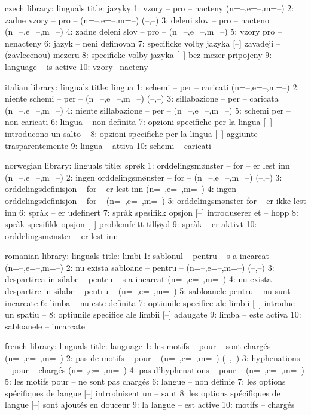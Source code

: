 
\startmessages  czech  library: linguals
  title: jazyky
      1: vzory -- pro -- nacteny (n=--,e=--,m=--)
      2: zadne vzory -- pro -- (n=--,e=--,m=--) (--,--)
      3: deleni slov -- pro -- nacteno (n=--,e=--,m=--)
      4: zadne deleni slov -- pro -- (n=--,e=--,m=--)
      5: vzory pro -- nenacteny
      6: jazyk -- neni definovan
      7: specificke volby jazyka [--] zavadeji -- (zavlecenou) mezeru
      8: specificke volby jazyka [--] bez mezer pripojeny
      9: language -- is active
     10: vzory --nacteny
\stopmessages

\startmessages  italian  library: linguals
  title: lingua
      1: schemi -- per -- caricati (n=--,e=--,m=--)
      2: niente schemi -- per -- (n=--,e=--,m=--) (--,--)
      3: sillabazione -- per -- caricata (n=--,e=--,m=--)
      4: niente sillabazione -- per -- (n=--,e=--,m=--)
      5: schemi per -- non caricati
      6: lingua -- non definita
      7: opzioni specifiche per la lingua [--] introducono un salto --
      8: opzioni specifiche per la lingua [--] aggiunte trasparentemente
      9: lingua -- attiva
     10: schemi -- caricati
\stopmessages

\startmessages  norwegian  library: linguals
  title: sprøk
      1: orddelingsmønster -- for -- er lest inn (n=--,e=--,m=--)
      2: ingen orddelingsmønster -- for -- (n=--,e=--,m=--) (--,--)
      3: orddelingsdefinisjon -- for -- er lest inn (n=--,e=--,m=--)
      4: ingen orddelingsdefinisjon -- for -- (n=--,e=--,m=--)
      5: orddelingsmønster for -- er ikke lest inn
      6: spràk -- er udefinert
      7: spràk spesifikk opsjon [--] introduserer et -- hopp
      8: spràk spesifikk opsjon [--] problemfritt tilføyd
      9: spràk -- er aktivt
     10: orddelingsmønster -- er lest inn
\stopmessages

\startmessages  romanian  library: linguals
  title: limbi
      1: sablonul -- pentru -- s-a incarcat (n=--,e=--,m=--)
      2: nu exista sabloane -- pentru -- (n=--,e=--,m=--) (--,--)
      3: despartirea in silabe -- pentru -- s-a incarcat (n=--,e=--,m=--)
      4: nu exista despartire in silabe -- pentru -- (n=--,e=--,m=--)
      5: sabloanele pentru -- nu sunt incarcate
      6: limba -- nu este definita
      7: optiunile specifice ale limbii [--] introduc un spatiu --
      8: optiunile specifice ale limbii [--] adaugate
      9: limba -- este activa
     10: sabloanele -- incarcate
\stopmessages

\startmessages  french  library: linguals
  title: language
      1: les motifs -- pour -- sont chargés (n=--,e=--,m=--)
      2: pas de motifs -- pour -- (n=--,e=--,m=--) (--,--)
      3: hyphenations -- pour -- chargés (n=--,e=--,m=--)
      4: pas d'hyphenations -- pour -- (n=--,e=--,m=--)
      5: les motifs pour -- ne sont pas chargés
      6: langue -- non définie
      7: les options spécifiques de langue [--] introduisent un -- saut
      8: les options spécifiques de langue [--] sont ajoutés en douceur
      9: la langue -- est active
     10: motifs -- chargés
\stopmessages

